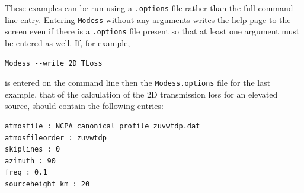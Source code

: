 These examples can be run using a \verb+.options+ file rather than the full command line entry. Entering \verb+Modess+ without any arguments writes the help page to the screen even if there is a \verb+.options+ file present so that at least one argument must be entered as well. If, for example,
\begin{verbatim}
Modess --write_2D_TLoss
\end{verbatim}
is entered on the command line then the \verb+Modess.options+ file for the last example, that of the calculation of the 2D transmission loss for an elevated source, should contain the following entries: 
\begin{verbatim}
atmosfile : NCPA_canonical_profile_zuvwtdp.dat
atmosfileorder : zuvwtdp
skiplines : 0
azimuth : 90
freq : 0.1
sourceheight_km : 20
\end{verbatim}
 



